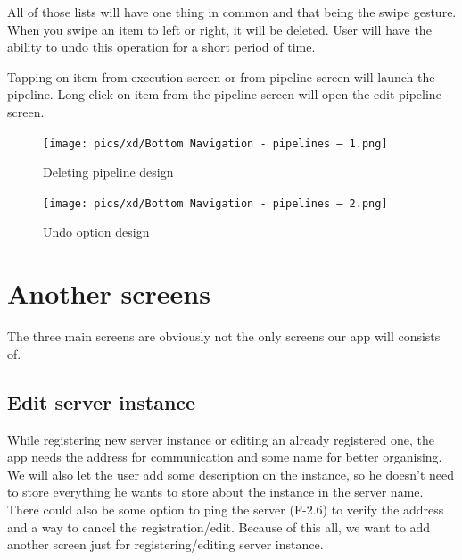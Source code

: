 All of those lists will have one thing in common and that being the swipe gesture.
When you swipe an item to left or right, it will be deleted.
User will have the ability to undo this operation for a short period of time.

Tapping on item from execution screen or from pipeline screen will launch the pipeline.
Long click on item from the pipeline screen will open the edit pipeline screen.

\begin{figure}\centering
    \begin{minipage}[b]{0.32\textwidth}
    	\texttt{[image: pics/xd/Bottom Navigation - pipelines – 1.png]}
    	\caption[Deleting pipeline]{Deleting pipeline design}\label{fig:xdDeletePipeline}
    \end{minipage}
    \begin{minipage}[b]{0.32\textwidth}
    	\texttt{[image: pics/xd/Bottom Navigation - pipelines – 2.png]}
    	\caption[Undo option]{Undo option design}\label{fig:xdUndo}
    \end{minipage}
\end{figure}

\section{Another screens}
The three main screens are obviously not the only screens our app will consists of.

\subsection{Edit server instance}
While registering new server instance or editing an already registered one, the app needs the address for communication and some name for better organising.
We will also let the user add some description on the instance, so he doesn't need to store everything he wants to store about the instance in the server name.
There could also be some option to ping the server (F-2.6) to verify the address and a way to cancel the registration/edit.
Because of this all, we want to add another screen just for registering/editing server instance.

